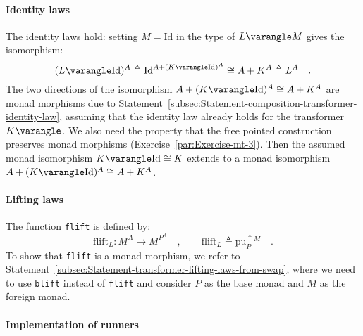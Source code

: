 \paragraph{Identity laws}

The identity laws hold: setting $M=\text{Id}$ in the type of $L\varangle M$
gives the isomorphism:
\[
(L\varangle\text{Id})^{A}\triangleq\text{Id}^{A+(K\varangle\text{Id})^{A}}\cong A+K^{A}\triangleq L^{A}\quad.
\]
The two directions of the isomorphism $A+(K\varangle\text{Id})^{A}\cong A+K^{A}$
are monad morphisms due to Statement~\ref{subsec:Statement-composition-transformer-identity-law},
assuming that the identity law already holds for the transformer $K\varangle$.
We also need the property that the free pointed construction preserves
monad morphisms (Exercise~\ref{par:Exercise-mt-3}). Then the assumed
monad isomorphism $K\varangle\text{Id}\cong K$ extends to a monad
isomorphism $A+(K\varangle\text{Id})^{A}\cong A+K^{A}$.

\paragraph{Lifting laws}

The function \lstinline!flift! is defined by:
\[
\text{flift}_{L}:M^{A}\rightarrow M^{P^{A}}\quad,\quad\quad\text{flift}_{L}\triangleq\text{pu}_{P}^{\uparrow M}\quad.
\]
To show that \lstinline!flift! is a monad morphism, we refer to Statement~\ref{subsec:Statement-transformer-lifting-laws-from-swap},
where we need to use \lstinline!blift! instead of \lstinline!flift!
and consider $P$ as the base monad and $M$ as the foreign monad.

\paragraph{Implementation of runners}

